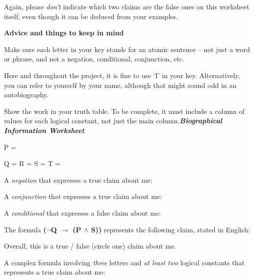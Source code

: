 \documentclass[oneside, openany]{book} %
\begin{document}
\noindent Again, please \textit{don't }indicate which two claims are the false ones on this worksheet itself, even though it can be deduced from your examples.

\noindent 

\noindent 

\noindent \textbf{Advice and things to keep in mind}

\noindent 

\noindent 

\noindent 

\noindent Make sure each letter in your key stands for an atomic sentence -- not just a word or phrase, and not a negation, conditional, conjunction, etc.

\noindent Here and throughout the project, it is fine to use `I' in your key. Alternatively, you can refer to yourself by your name, although that might sound odd in an autobiography.

\noindent Show the work in your truth table. To be complete, it must include a column of values for each logical constant, not just the main column.\textbf{\textit{Biographical Information Worksheet}}

\noindent 

\noindent {}

\noindent 

\noindent P =

\noindent 

\noindent Q = R = S = T =

\noindent A \textit{negation }that expresses a true claim about me: \underbar{ }

\noindent 

\noindent A \textit{conjunction }that expresses a true claim about me: \underbar{ }

\noindent 

\noindent A \textit{conditional }that expresses a false claim about me: \underbar{ }

\noindent 

\noindent The formula \textbf{($\boldsymbol{\mathrm{\neg}}$Q $\boldsymbol{\mathrm{\to}}$ (P $\boldsymbol{\mathrm{\wedge}}$ S)) }represents the following claim, stated in English:


\noindent Overall, this is a   true / false   (circle one) claim about me.


\noindent A complex formula involving \textit{three }letters and \textit{at least two }logical constants that represents a true claim about me: \underbar{ }
\end{document}

